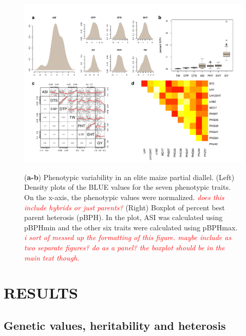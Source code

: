 \documentclass[twoside,twocolumn, letterpaper]{article}
\renewcommand{\baselinestretch}{1}
\newcommand{\jri}[1]{\textcolor{red}{ \emph{ #1}} }
\begin{document}
\begin{figure}[tb]   
  \begin{center}
   \vspace{-2mm}
   \includegraphics[width=0.8\linewidth]{Fig1_pheno.pdf}
   \renewcommand{\baselinestretch}{0.9}
   \vspace{-3mm}
   \caption{({\bfseries a-b}) Phenotypic variability in an elite maize partial diallel. (Left) Density plots of the BLUE values for the seven phenotypic traits. On the x-axis, the phenotypic values were normalized. \jri{does this include hybrids or just parents?} (Right) Boxplot of percent best parent heterosis (pBPH). In the plot, ASI was calculated using pBPHmin and the other six traits were calculated using pBPHmax. \jri{i sort of messed up the formatting of this figure. maybe include as two separate figures? do as a panel? the boxplot should be in the main text though. }} 
\vspace{-4mm}
    \label{fig:pheno}
  \end{center}
\end{figure}


\section*{RESULTS}
\subsection*{Genetic values, heritability and heterosis}
\end{document}
